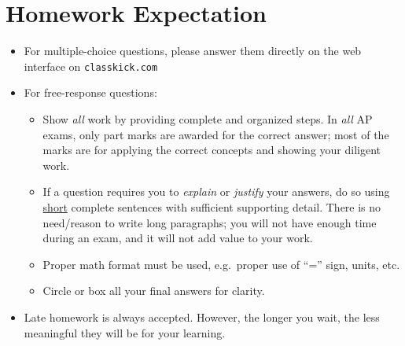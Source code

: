 \documentclass{../../../oss-handout}
\begin{document}
\section{Homework Expectation}
\begin{itemize}[nosep]
\item For multiple-choice questions, please answer them directly on the web
  interface on \texttt{classkick.com} %
\item For free-response questions:
  \begin{itemize}[nosep]
  \item Show \emph{all} work by providing complete and organized steps. In
    \emph{all} AP exams, only part marks are awarded for the correct answer;
    most of the marks are for applying the correct concepts and showing your
    diligent work.
  \item If a question requires you to \emph{explain} or \emph{justify} your
    answers, do so using \underline{short} complete sentences with sufficient
    supporting detail. There is no need/reason to write long paragraphs; you
    will not have enough time during an exam, and it will not add value to
    your work.
  \item Proper math format must be used, e.g.\ proper use of ``='' sign, units,
    etc.
  \item Circle or box all your final answers for clarity.
  \end{itemize}
\item Late homework is always accepted. However, the longer you wait, the less
  meaningful they will be for your learning.
\end{itemize}

\end{document}

